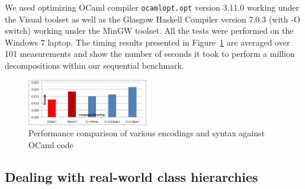 

We used optimizing OCaml compiler \texttt{ocamlopt.opt} version 3.11.0 working 
under the Visual \Cpp{} toolset as well as the Glasgow Haskell Compiler version 
7.0.3 (with -O switch) working under the MinGW toolset. All the tests were 
performed on the Windows 7 laptop.
The timing results presented in Figure~\ref{fig:OCamlComparison} are averaged 
over 101 measurements and show the number of seconds it took to perform a 
million decompositions within our sequential benchmark.

\begin{figure}[htbp]
  \centering
    \includegraphics[width=0.47\textwidth]{OCamlComparison.png}
  \caption{Performance comparison of various encodings and syntax against OCaml code}
  \label{fig:OCamlComparison}
\end{figure}


\subsection{Dealing with real-world class hierarchies}
\label{sec:hierarchies}

